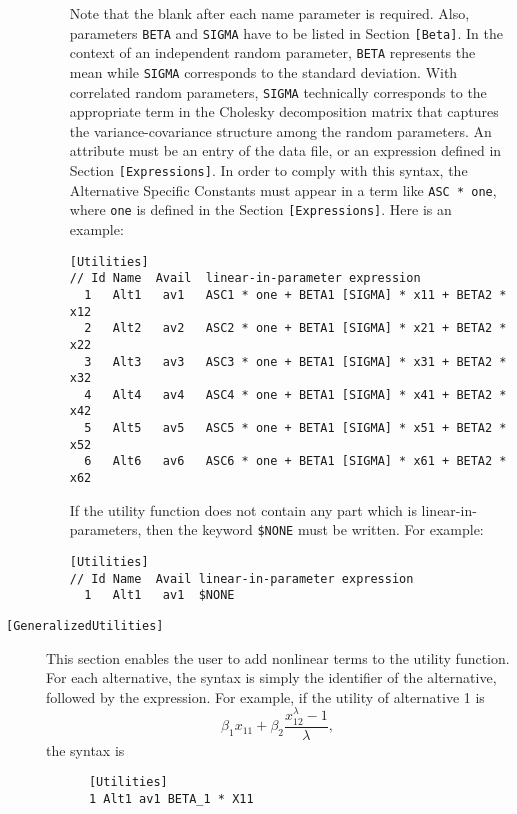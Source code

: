 \documentclass[12pt,a4paper]{article}
\newcommand{\specitem}[1]{\texttt{[#1]}}
\begin{document}
\begin{description}
\begin{enumerate}
         Note that the blank after each name parameter is required. Also,
         parameters \verb+BETA+ and \verb+SIGMA+ have to be listed in
         Section \verb+[Beta]+. In the context of an independent random parameter, 
         \verb+BETA+ represents the mean while \verb+SIGMA+ corresponds to the standard deviation. 
         With correlated random parameters, \verb+SIGMA+ technically corresponds to the appropriate term 
         in the Cholesky decomposition matrix that captures the variance-covariance structure among 
         the random parameters.
         An attribute must be an entry of the data file,
         or an expression defined in Section \verb+[Expressions]+.
         In order to comply with this syntax, the  Alternative Specific Constants must
         appear in a term like \verb+ASC * one+, where \verb+one+ is defined in the Section \verb+[Expressions]+.
         Here is an example:
\begin{verbatim}
[Utilities]
// Id Name  Avail  linear-in-parameter expression
  1   Alt1   av1   ASC1 * one + BETA1 [SIGMA] * x11 + BETA2 * x12
  2   Alt2   av2   ASC2 * one + BETA1 [SIGMA] * x21 + BETA2 * x22
  3   Alt3   av3   ASC3 * one + BETA1 [SIGMA] * x31 + BETA2 * x32
  4   Alt4   av4   ASC4 * one + BETA1 [SIGMA] * x41 + BETA2 * x42
  5   Alt5   av5   ASC5 * one + BETA1 [SIGMA] * x51 + BETA2 * x52
  6   Alt6   av6   ASC6 * one + BETA1 [SIGMA] * x61 + BETA2 * x62
\end{verbatim}
         
         If the utility function does not contain any part which is
         linear-in-parameters, then the keyword \verb+$NONE+ must be
         written. For example:
         \begin{verbatim}
[Utilities]
// Id Name  Avail linear-in-parameter expression
  1   Alt1   av1  $NONE
\end{verbatim}
     \end{enumerate}
  
   \item[\specitem{GeneralizedUtilities}] 
      This section enables the user to add nonlinear terms to the utility
      function. For each alternative, the syntax is simply the identifier of the
      alternative, followed by the expression.  For example, if the utility
      of alternative 1 is 
      \[
      \beta_1 x_{11} + \beta_2 \frac{x_{12}^\lambda-1}{\lambda}, 
      \] 
      the syntax
      is 
      \begin{verbatim}
      [Utilities]
      1 Alt1 av1 BETA_1 * X11


\end{verbatim}
\end{description}
\end{document}
